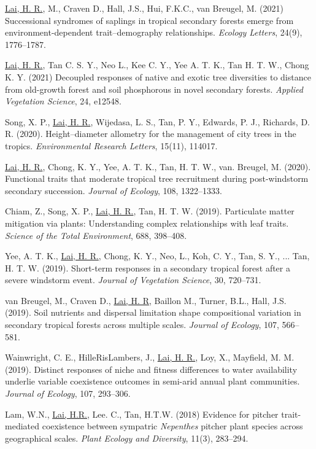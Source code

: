 \documentclass[a4paper]{article}
\begin{document}
\hangindent=1cm \underline{Lai, H. R.}, M., Craven D., Hall, J.S., Hui, F.K.C., van Breugel, M. (2021) Successional syndromes of saplings in tropical secondary forests emerge from environment-dependent trait--demography relationships. \textit{Ecology Letters}, 24(9), 1776--1787.

\hangindent=1cm \underline{Lai, H. R.}, Tan C. S. Y., Neo L., Kee C. Y., Yee A. T. K., Tan H. T. W., Chong K. Y. (2021) Decoupled responses of native and exotic tree diversities to distance from old-growth forest and soil phosphorous in novel secondary forests. \textit{Applied Vegetation Science}, 24, e12548. 

\hangindent=1cm Song, X. P., \underline{Lai, H. R.}, Wijedasa, L. S., Tan, P. Y., Edwards, P. J., Richards, D. R. (2020). Height--diameter allometry for the management of city trees in the tropics. \textit{Environmental Research Letters}, 15(11), 114017.

\hangindent=1cm \underline{Lai, H. R.}, Chong, K. Y., Yee, A. T. K., Tan, H. T. W., van. Breugel, M. (2020). Functional traits that moderate tropical tree recruitment during post-windstorm secondary succession. \textit{Journal of Ecology}, 108, 1322--1333.

\hangindent=1cm Chiam, Z., Song, X. P., \underline{Lai, H. R.}, Tan, H. T. W. (2019). Particulate matter mitigation via plants: Understanding complex relationships with leaf traits. \textit{Science of the Total Environment}, 688, 398--408.

\hangindent=1cm Yee, A. T. K., \underline{Lai, H. R.}, Chong, K. Y., Neo, L., Koh, C. Y., Tan, S. Y., ... Tan, H. T. W. (2019). Short-term responses in a secondary tropical forest after a severe windstorm event. \textit{Journal of Vegetation Science}, 30, 720--731.

\hangindent=1cm van Breugel, M., Craven D., \underline{Lai, H. R}, Baillon M., Turner, B.L., Hall, J.S. (2019). Soil nutrients and dispersal limitation shape compositional variation in secondary tropical forests across multiple scales. \textit{Journal of Ecology}, 107, 566--581.

\hangindent=1cm Wainwright, C. E., HilleRisLambers, J., \underline{Lai, H. R.}, Loy, X., Mayfield, M. M. (2019). Distinct responses of niche and fitness differences to water availability underlie variable coexistence outcomes in semi-arid annual plant communities. \textit{Journal of Ecology}, 107, 293--306.

\hangindent=1cm Lam, W.N., \underline{Lai, H.R.}, Lee. C., Tan, H.T.W. (2018) Evidence for pitcher trait-mediated coexistence between sympatric \textit{Nepenthes} pitcher plant species across geographical scales. \textit{Plant Ecology and Diversity}, 11(3), 283--294.
\end{document}
